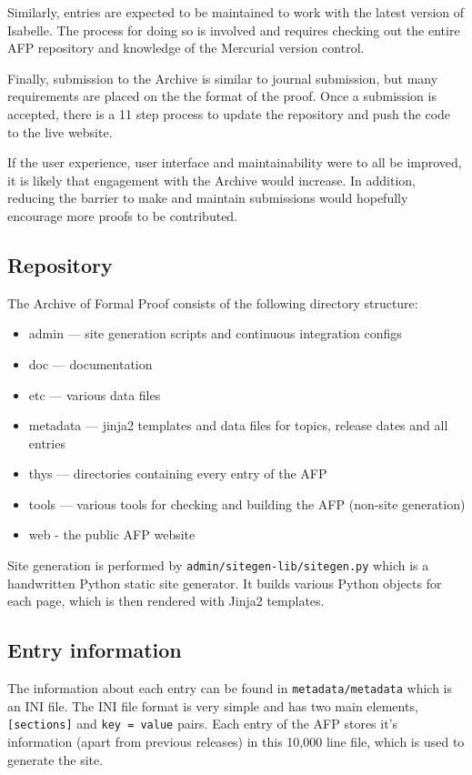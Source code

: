 \documentclass[frontabs,bsc,singlespacing,parskip,deptreport]{infthesis}
\begin{document}
Similarly, entries are expected to be maintained to work with the latest version of Isabelle. The process for doing so is involved and requires checking out the entire AFP repository and knowledge of the Mercurial version control. 

Finally, submission to the Archive is similar to journal submission, but many requirements are placed on the the format of the proof. Once a submission is accepted, there is a 11 step process to update the repository and push the code to the live website. 

If the user experience, user interface and maintainability were to all be improved, it is likely that engagement with the Archive would increase. In addition, reducing the barrier to make and maintain submissions would hopefully encourage more proofs to be contributed.

\subsection{Repository}

The Archive of Formal Proof consists of the following directory structure:

\begin{itemize}
  \item admin — site generation scripts and continuous integration configs
  \item doc — documentation
  \item etc — various data files
  \item metadata — jinja2 templates and data files for topics, release dates and all entries
  \item thys — directories containing every entry of the AFP
  \item tools — various tools for checking and building the AFP (non-site generation)
  \item web - the public AFP website
\end{itemize}

Site generation is performed by \verb|admin/sitegen-lib/sitegen.py| which is a handwritten Python static site generator. It builds various Python objects for each page, which is then rendered with Jinja2 templates. 

\subsection{Entry information}

The information about each entry can be found in \verb|metadata/metadata| which is an INI file. The INI file format is very simple and has two main elements, \verb|[sections]| and \verb|key = value| pairs. Each entry of the AFP stores it's information (apart from previous releases) in this 10,000 line file, which is used to generate the site.
\end{document}
